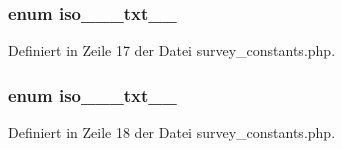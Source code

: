 \subsubsection{\setlength{\rightskip}{0pt plus 5cm}enum {\bf iso\_\_\_\-txt\_\_\-}}\label{survey__constants_8php_6e833af8c1882703f1dd7b9f714e78c3}




Definiert in Zeile 17 der Datei survey\_\-constants.php.
\subsubsection{\setlength{\rightskip}{0pt plus 5cm}enum {\bf iso\_\_\_\-txt\_\_\-}}\label{survey__constants_8php_8ca53f5da40fdadf21c6581009e00a27}




Definiert in Zeile 18 der Datei survey\_\-constants.php.